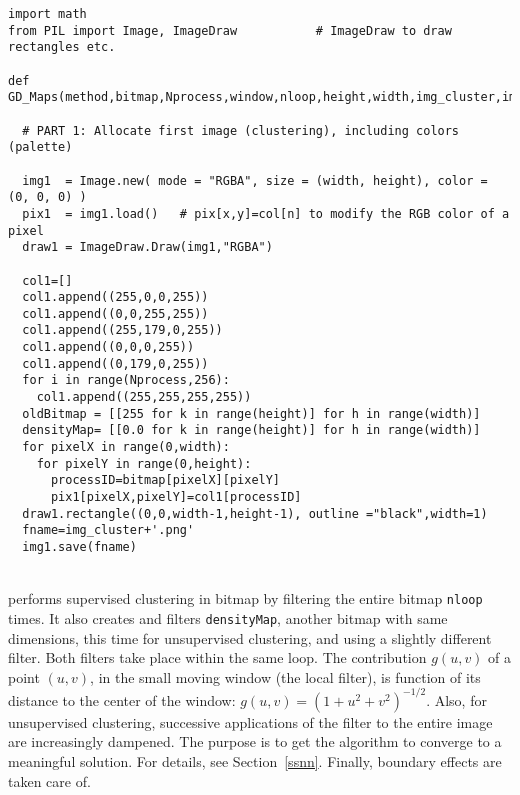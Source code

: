 \documentclass[10pt]{article}
\begin{document}
\begin{lstlisting}
import math
from PIL import Image, ImageDraw           # ImageDraw to draw rectangles etc.

def GD_Maps(method,bitmap,Nprocess,window,nloop,height,width,img_cluster,img_density):

  # PART 1: Allocate first image (clustering), including colors (palette)

  img1  = Image.new( mode = "RGBA", size = (width, height), color = (0, 0, 0) )
  pix1  = img1.load()   # pix[x,y]=col[n] to modify the RGB color of a pixel
  draw1 = ImageDraw.Draw(img1,"RGBA")

  col1=[]
  col1.append((255,0,0,255))
  col1.append((0,0,255,255))
  col1.append((255,179,0,255))
  col1.append((0,0,0,255))
  col1.append((0,179,0,255))
  for i in range(Nprocess,256):
    col1.append((255,255,255,255))
  oldBitmap = [[255 for k in range(height)] for h in range(width)]
  densityMap= [[0.0 for k in range(height)] for h in range(width)]
  for pixelX in range(0,width):
    for pixelY in range(0,height):
      processID=bitmap[pixelX][pixelY]
      pix1[pixelX,pixelY]=col1[processID]
  draw1.rectangle((0,0,width-1,height-1), outline ="black",width=1)
  fname=img_cluster+'.png'
  img1.save(fname)
\end{lstlisting}
\quad \\
 performs supervised clustering in bitmap by filtering the entire bitmap \texttt{nloop} times. It also creates and filters
\texttt{densityMap}, another bitmap with same dimensions, this time for unsupervised clustering, and using a slightly different filter. Both filters take place within the same loop.
The contribution $g(u,v)$ of a point $(u, v)$, in the small moving window (the local filter), is function of its distance to the center of the
window: $g(u,v)=(1+u^2+v^2)^{-1/2}$. Also, for unsupervised clustering, successive applications of the filter to the entire image are increasingly dampened. The purpose is to get the algorithm to converge to a meaningful solution. For details, see Section~\ref{ssnn}.
Finally, boundary effects are taken care of.
\end{document}
